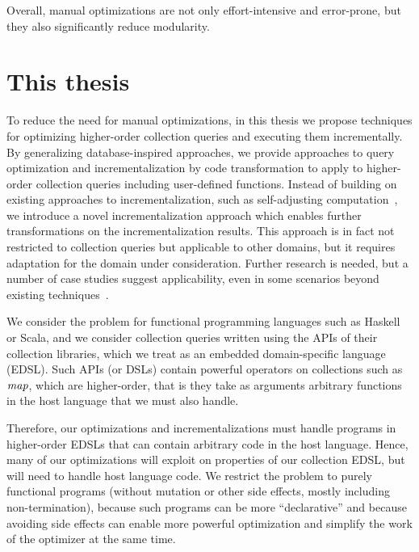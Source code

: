 Overall, manual optimizations are not only effort-intensive and error-prone, but
they also significantly reduce modularity.

\section{This thesis}
To reduce the need for manual optimizations, in this thesis we propose
techniques for optimizing higher-order collection queries and executing them
incrementally.
By generalizing database-inspired approaches, we provide approaches to query optimization and
incrementalization by code transformation to apply to higher-order collection
queries including user-defined functions.
Instead of building on existing approaches to incrementalization, such as
self-adjusting computation~\citep{Acar09}, we introduce a novel
incrementalization approach which enables further transformations on the
incrementalization results. This approach is in fact not restricted to
collection queries but applicable to other domains, but it requires adaptation
for the domain under consideration.
%
Further research is needed, but a number of case studies suggest
applicability, even in some scenarios beyond existing
techniques~\citep{Koch2016incremental}.

We consider the problem for functional programming languages such as Haskell or
Scala, and we consider collection queries written using the APIs of their
collection libraries, which we treat as an embedded domain-specific language
(EDSL). Such APIs (or DSLs) contain powerful operators on collections such as
$\mathit{map}$,
which are higher-order, that
is they take as arguments arbitrary functions in the host language that we must
also handle.

Therefore, our optimizations and incrementalizations must handle programs in
higher-order EDSLs that can contain arbitrary code in the host language. Hence,
many of our optimizations will exploit on properties of our collection EDSL, but
will need to handle host language code. We restrict the problem to purely
functional programs (without mutation or other side effects, mostly including
non-termination), because such programs can be more ``declarative'' and because
avoiding side effects can enable more powerful optimization and simplify the
work of the optimizer at the same time.

